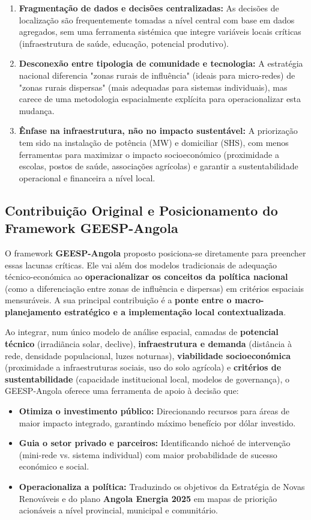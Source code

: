 \documentclass[12pt, a4paper]{article}
\begin{document}
\begin{enumerate}
\item \textbf{Fragmentação de dados e decisões centralizadas:} As decisões de localização são frequentemente tomadas a nível central com base em dados agregados, sem uma ferramenta sistémica que integre variáveis locais críticas (infraestrutura de saúde, educação, potencial produtivo).
\item \textbf{Desconexão entre tipologia de comunidade e tecnologia:} A estratégia nacional diferencia "zonas rurais de influência" (ideais para micro-redes) de "zonas rurais dispersas" (mais adequadas para sistemas individuais), mas carece de uma metodologia espacialmente explícita para operacionalizar esta mudança.
\item \textbf{Ênfase na infraestrutura, não no impacto sustentável:} A priorização tem sido na instalação de potência (MW) e domiciliar (SHS), com menos ferramentas para maximizar o impacto socioeconómico (proximidade a escolas, postos de saúde, associações agrícolas) e garantir a sustentabilidade operacional e financeira a nível local.
\end{enumerate}

\subsection{Contribuição Original e Posicionamento do Framework GEESP-Angola}

O framework \textbf{GEESP-Angola} proposto posiciona-se diretamente para preencher essas lacunas críticas. Ele vai além dos modelos tradicionais de adequação técnico-económica ao \textbf{operacionalizar os conceitos da política nacional} (como a diferenciação entre zonas de influência e dispersas) em critérios espaciais mensuráveis. A sua principal contribuição é a \textbf{ponte entre o macro-planejamento estratégico e a implementação local contextualizada}.

Ao integrar, num único modelo de análise espacial, camadas de \textbf{potencial técnico} (irradiãncia solar, declive), \textbf{infraestrutura e demanda} (distância à rede, densidade populacional, luzes noturnas), \textbf{viabilidade socioeconómica} (proximidade a infraestruturas sociais, uso do solo agrícola) e \textbf{critérios de sustentabilidade} (capacidade institucional local, modelos de governança), o GEESP-Angola oferece uma ferramenta de apoio à decisão que:

\begin{itemize}
\item \textbf{Otimiza o investimento público:} Direcionando recursos para áreas de maior impacto integrado, garantindo máximo benefício por dólar investido.
\item \textbf{Guia o setor privado e parceiros:} Identificando nichoé de intervenção (mini-rede vs. sistema individual) com maior probabilidade de sucesso económico e social.
\item \textbf{Operacionaliza a política:} Traduzindo os objetivos da Estratégia de Novas Renováveis e do plano \textbf{Angola Energia 2025} em mapas de priorição acionáveis a nível provincial, municipal e comunitário.
\end{itemize}
\end{document}
